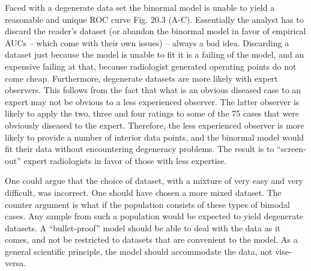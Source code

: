 \documentclass[
]{book}
\begin{document}
Faced with a degenerate data set the binormal model is unable to yield a reasonable and unique ROC curve Fig. 20.3 (A-C). Essentially the analyst has to discard the reader's dataset (or abandon the binormal model in favor of empirical AUCs -- which come with their own issues) -- always a bad idea. Discarding a dataset just because the model is unable to fit it is a failing of the model, and an expensive failing at that, because radiologist generated operating points do not come cheap. Furthermore, degenerate datasets are more likely with expert observers. This follows from the fact that what is an obvious diseased case to an expert may not be obvious to a less experienced observer. The latter observer is likely to apply the two, three and four ratings to some of the 75 cases that were obviously diseased to the expert. Therefore, the less experienced observer is more likely to provide a number of interior data points, and the binormal model would fit their data without encountering degeneracy problems. The result is to ``screen-out'' expert radiologists in favor of those with less expertise.

One could argue that the choice of dataset, with a mixture of very easy and very difficult, was incorrect. One should have chosen a more mixed dataset. The counter argument is what if the population consists of these types of bimodal cases. Any sample from such a population would be expected to yield degenerate datasets. A ``bullet-proof'' model should be able to deal with the data as it comes, and not be restricted to datasets that are convenient to the model. As a general scientific principle, the model should accommodate the data, not vise-versa.
\end{document}
